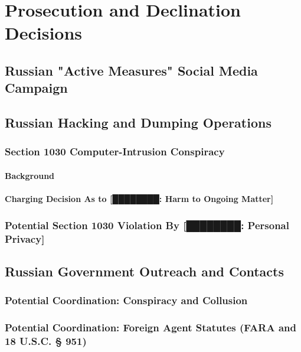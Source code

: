 \section{Prosecution and Declination Decisions}

\subsection{Russian "Active Measures" Social Media Campaign}

\subsection{Russian Hacking and Dumping Operations}

\subsubsection{Section 1030 Computer-Intrusion Conspiracy}

\paragraph{Background}

\paragraph{Charging Decision As to [████████: Harm to Ongoing Matter]}

\subsubsection{Potential Section 1030 Violation By [████████: Personal Privacy]}

\subsection{Russian Government Outreach and Contacts}

\subsubsection{Potential Coordination: Conspiracy and Collusion}

\subsubsection{Potential Coordination: Foreign Agent Statutes (FARA and 18 U.S.C. § 951)}

